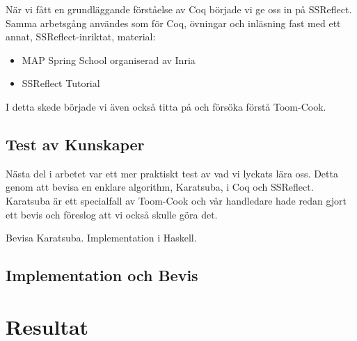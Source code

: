 \documentclass[a4paper]{article}
\begin{document}
När vi fått en grundläggande förståelse av Coq började vi ge oss in på
SSReflect. Samma arbetsgång användes som för Coq, övningar och inläsning fast
med ett annat, SSReflect-inriktat, material:
\begin{itemize}
  \item MAP Spring School organiserad av Inria
  \item SSReflect Tutorial
\end{itemize}
I detta skede började vi även också titta på och försöka förstå Toom-Cook.

\subsection{Test av Kunskaper}
Nästa del i arbetet var ett mer praktiskt test av vad vi lyckats lära oss.
Detta genom att bevisa en enklare algorithm, Karatsuba, i Coq och SSReflect.
Karatsuba är ett specialfall av Toom-Cook och vår handledare hade redan gjort
ett bevis och föreslog att vi också skulle göra det.

Bevisa Karatsuba. Implementation i Haskell.

\subsection{Implementation och Bevis}

\section{Resultat}



\nocite{*}

\appendix
\end{document}
